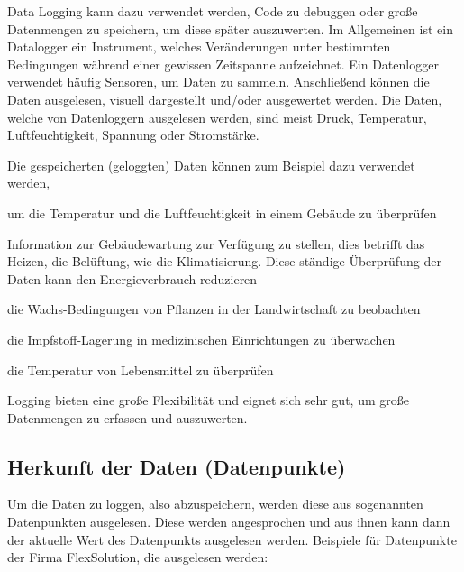 
Data Logging kann dazu verwendet werden, Code zu debuggen oder große Datenmengen zu speichern, um diese später auszuwerten. Im Allgemeinen ist ein Datalogger ein Instrument, welches Veränderungen unter bestimmten Bedingungen während einer gewissen Zeitspanne aufzeichnet. Ein Datenlogger verwendet häufig Sensoren, um Daten zu sammeln. Anschließend können die Daten ausgelesen, visuell dargestellt und/oder ausgewertet werden. Die Daten, welche von Datenloggern ausgelesen werden, sind meist Druck, Temperatur, Luftfeuchtigkeit, Spannung oder Stromstärke. \cite{DataLogging} 

Die gespeicherten (geloggten) Daten können zum Beispiel dazu verwendet werden, 

\begin{compactitem}
    \item um die Temperatur und die Luftfeuchtigkeit in einem Gebäude zu überprüfen
    \item Information zur Gebäudewartung zur Verfügung zu stellen, dies betrifft das Heizen, die Belüftung, wie die Klimatisierung. Diese ständige Überprüfung der Daten kann den Energieverbrauch reduzieren
    \item die Wachs-Bedingungen von Pflanzen in der Landwirtschaft zu beobachten
    \item die Impfstoff-Lagerung in medizinischen Einrichtungen zu überwachen
    \item die Temperatur von Lebensmittel zu überprüfen
\end{compactitem}
\cite{DataLogging}

Logging bieten eine große Flexibilität und eignet sich sehr gut, um große Datenmengen zu erfassen und auszuwerten. \cite{BigDataBuch}

\subsection{Herkunft der Daten (Datenpunkte)}
Um die Daten zu loggen, also abzuspeichern, werden diese aus sogenannten Datenpunkten ausgelesen. Diese werden angesprochen und aus ihnen kann dann der aktuelle Wert des Datenpunkts ausgelesen werden.
Beispiele für Datenpunkte der Firma FlexSolution, die ausgelesen werden: 

